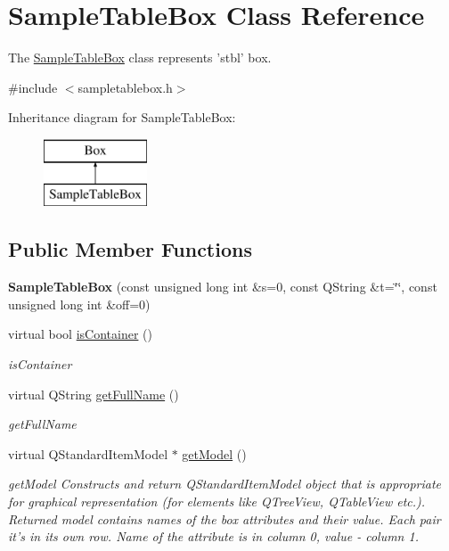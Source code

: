 \hypertarget{class_sample_table_box}{\section{Sample\-Table\-Box Class Reference}
\label{class_sample_table_box}
}


The \hyperlink{class_sample_table_box}{Sample\-Table\-Box} class represents 'stbl' box.  




{\ttfamily \#include $<$sampletablebox.\-h$>$}

Inheritance diagram for Sample\-Table\-Box\-:\begin{figure}[H]
\begin{center}
\leavevmode
\includegraphics[height=2.000000cm]{class_sample_table_box}
\end{center}
\end{figure}
\subsection*{Public Member Functions}
\begin{DoxyCompactItemize}
\item 
\hypertarget{class_sample_table_box_a48280f39a34198e6c3d946729c9b7461}{{\bfseries Sample\-Table\-Box} (const unsigned long int \&s=0, const Q\-String \&t=\char`\"{}\char`\"{}, const unsigned long int \&off=0)}\label{class_sample_table_box_a48280f39a34198e6c3d946729c9b7461}

\item 
virtual bool \hyperlink{class_sample_table_box_ad104b1eb63f6ce7926bbc7cee83fd29f}{is\-Container} ()
\begin{DoxyCompactList}\small\item\em is\-Container \end{DoxyCompactList}\item 
virtual Q\-String \hyperlink{class_sample_table_box_acdaf2b1d02df4da6fee980f328d24dbb}{get\-Full\-Name} ()
\begin{DoxyCompactList}\small\item\em get\-Full\-Name \end{DoxyCompactList}\item 
virtual Q\-Standard\-Item\-Model $\ast$ \hyperlink{class_sample_table_box_a59a54b04800609fe96e3fbeaeaedfd13}{get\-Model} ()
\begin{DoxyCompactList}\small\item\em get\-Model Constructs and return Q\-Standard\-Item\-Model object that is appropriate for graphical representation (for elements like Q\-Tree\-View, Q\-Table\-View etc.). Returned model contains names of the box attributes and their value. Each pair it's in its own row. Name of the attribute is in column 0, value -\/ column 1. \end{DoxyCompactList}\end{DoxyCompactItemize}
